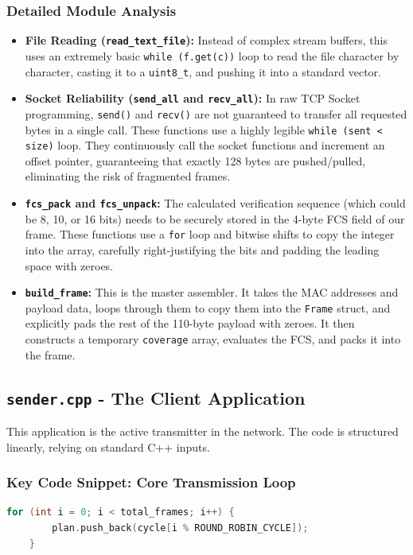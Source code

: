 \documentclass[12pt, a4paper]{article}
\begin{document}
\subsubsection{Detailed Module Analysis}
\begin{itemize}
    \item \textbf{File Reading (\texttt{read\_text\_file}):} Instead of complex stream buffers, this uses an extremely basic \texttt{while (f.get(c))} loop to read the file character by character, casting it to a \texttt{uint8\_t}, and pushing it into a standard vector.
    \item \textbf{Socket Reliability (\texttt{send\_all} and \texttt{recv\_all}):} In raw TCP Socket programming, \texttt{send()} and \texttt{recv()} are not guaranteed to transfer all requested bytes in a single call. These functions use a highly legible \texttt{while (sent < size)} loop. They continuously call the socket functions and increment an offset pointer, guaranteeing that exactly 128 bytes are pushed/pulled, eliminating the risk of fragmented frames.
    \item \textbf{\texttt{fcs\_pack} and \texttt{fcs\_unpack}:} The calculated verification sequence (which could be 8, 10, or 16 bits) needs to be securely stored in the 4-byte FCS field of our frame. These functions use a \texttt{for} loop and bitwise shifts to copy the integer into the array, carefully right-justifying the bits and padding the leading space with zeroes. 
    \item \textbf{\texttt{build\_frame}:} This is the master assembler. It takes the MAC addresses and payload data, loops through them to copy them into the \texttt{Frame} struct, and explicitly pads the rest of the 110-byte payload with zeroes. It then constructs a temporary \texttt{coverage} array, evaluates the FCS, and packs it into the frame.
\end{itemize}

\subsection{\texttt{sender.cpp} - The Client Application}
This application is the active transmitter in the network. The code is structured linearly, relying on standard C++ inputs.

\subsubsection{Key Code Snippet: Core Transmission Loop}
\begin{lstlisting}[language=C++]
for (int i = 0; i < total_frames; i++) {
        plan.push_back(cycle[i % ROUND_ROBIN_CYCLE]);
    }
\end{lstlisting}
\end{document}
